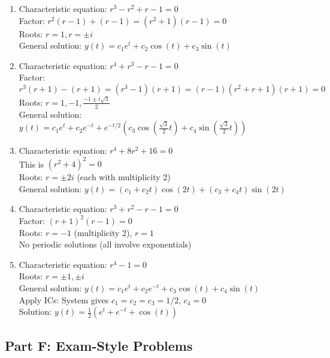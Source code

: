 \documentclass[12pt]{article}
\begin{document}
\begin{enumerate}[resume]
\item Characteristic equation: $r^3 - r^2 + r - 1 = 0$\\
Factor: $r^2(r-1) + (r-1) = (r^2+1)(r-1) = 0$\\
Roots: $r = 1, r = \pm i$\\
General solution: $y(t) = c_1e^t + c_2\cos(t) + c_3\sin(t)$

\item Characteristic equation: $r^4 + r^3 - r - 1 = 0$\\
Factor: $r^3(r+1) - (r+1) = (r^3-1)(r+1) = (r-1)(r^2+r+1)(r+1) = 0$\\
Roots: $r = 1, -1, \frac{-1 \pm i\sqrt{3}}{2}$\\
General solution: $y(t) = c_1e^t + c_2e^{-t} + e^{-t/2}(c_3\cos(\frac{\sqrt{3}}{2}t) + c_4\sin(\frac{\sqrt{3}}{2}t))$

\item Characteristic equation: $r^4 + 8r^2 + 16 = 0$\\
This is $(r^2 + 4)^2 = 0$\\
Roots: $r = \pm 2i$ (each with multiplicity 2)\\
General solution: $y(t) = (c_1 + c_2t)\cos(2t) + (c_3 + c_4t)\sin(2t)$

\item Characteristic equation: $r^3 + r^2 - r - 1 = 0$\\
Factor: $(r+1)^2(r-1) = 0$\\
Roots: $r = -1$ (multiplicity 2), $r = 1$\\
No periodic solutions (all involve exponentials)

\item Characteristic equation: $r^4 - 1 = 0$\\
Roots: $r = \pm 1, \pm i$\\
General solution: $y(t) = c_1e^t + c_2e^{-t} + c_3\cos(t) + c_4\sin(t)$\\
Apply ICs: System gives $c_1 = c_2 = c_3 = 1/2$, $c_4 = 0$\\
Solution: $y(t) = \frac{1}{2}(e^t + e^{-t} + \cos(t))$
\end{enumerate}

\subsection*{Part F: Exam-Style Problems}
\end{document}
